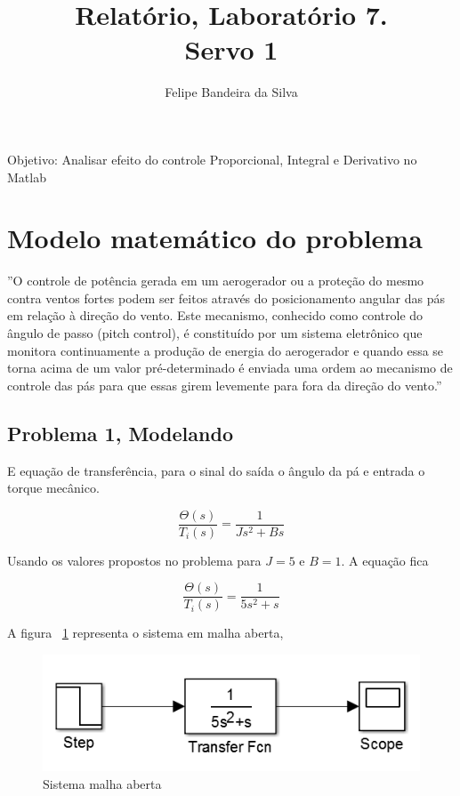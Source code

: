 \documentclass[a4paper, 10pt]{article}
\title{Relatório, Laboratório 7.\\Servo 1}
\author{Felipe Bandeira da Silva}
\date{}
\begin{document}
\maketitle

Objetivo: Analisar efeito do controle Proporcional, Integral e Derivativo no Matlab
\newpage

\listoffigures

\newpage

\section{Modelo matemático do problema}

''O controle de potência gerada em um aerogerador ou a proteção do mesmo contra
ventos fortes podem ser feitos através do posicionamento angular das pás em
relação à direção do vento. Este mecanismo, conhecido como controle do ângulo de
passo (pitch control), é constituído por um sistema eletrônico que monitora
continuamente a produção de energia do aerogerador e quando essa se torna acima
de um valor pré-determinado é enviada uma ordem ao mecanismo de controle das
pás para que essas girem levemente para fora da direção do vento.''

\subsection{Problema 1, Modelando}

E equação de transferência, para o sinal do saída o ângulo da pá e entrada o 
torque mecânico.

\begin{equation}
\frac{\Theta(s)}{T_i(s)} = \frac{1}{J s^2 + B s}
\end{equation}

Usando os valores propostos no problema para $J = 5$ e $B = 1$. A equação fica

\begin{equation}
\frac{\Theta(s)}{T_i(s)} = \frac{1}{5 s^2 + s}
\end{equation}

A figura ~\ref{fig:funcaoMalhaAberta} representa o sistema em malha aberta,

\begin{figure}[!ht]
	\centering
	\includegraphics[scale=.5]{fq1.png}
    \caption{Sistema malha aberta}
    \label{fig:funcaoMalhaAberta}
\end{figure}
\end{document}
